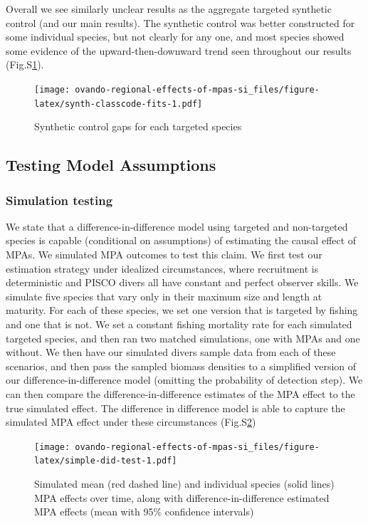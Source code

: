 \documentclass[]{article}
\begin{document}
Overall we see similarly unclear results as the aggregate targeted synthetic control (and our main results). The synthetic control was better constructed for some individual species, but not clearly for any one, and most species showed some evidence of the upward-then-downward trend seen throughout our results (Fig.S\ref{fig:synth-classcode-fits}).

\begin{figure}
\centering
\texttt{[image: ovando-regional-effects-of-mpas-si\_files/figure-latex/synth-classcode-fits-1.pdf]}
\caption{\label{fig:synth-classcode-fits}Synthetic control gaps for each targeted species}
\end{figure}

\hypertarget{testing-model-assumptions}{%
\subsection{Testing Model Assumptions}\label{testing-model-assumptions}}

\hypertarget{simulation-testing}{%
\subsubsection{Simulation testing}\label{simulation-testing}}

We state that a difference-in-difference model using targeted and non-targeted species is capable (conditional on assumptions) of estimating the causal effect of MPAs. We simulated MPA outcomes to test this claim. We first test our estimation strategy under idealized circumstances, where recruitment is deterministic and PISCO divers all have constant and perfect observer skills. We simulate five species that vary only in their maximum size and length at maturity. For each of these species, we set one version that is targeted by fishing and one that is not. We set a constant fishing mortality rate for each simulated targeted species, and then ran two matched simulations, one with MPAs and one without. We then have our simulated divers sample data from each of these scenarios, and then pass the sampled biomass densities to a simplified version of our difference-in-difference model (omitting the probability of detection step). We can then compare the difference-in-difference estimates of the MPA effect to the true simulated effect. The difference in difference model is able to capture the simulated MPA effect under these circumstances (Fig.S\ref{fig:simple-did-test})

\begin{figure}
\centering
\texttt{[image: ovando-regional-effects-of-mpas-si\_files/figure-latex/simple-did-test-1.pdf]}
\caption{\label{fig:simple-did-test}Simulated mean (red dashed line) and individual species (solid lines) MPA effects over time, along with difference-in-difference estimated MPA effects (mean with 95\% confidence intervals)}
\end{figure}
\end{document}
